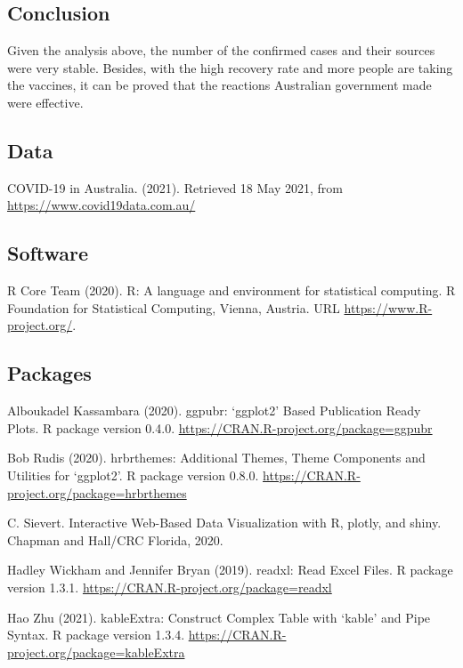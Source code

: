 \documentclass[11pt,a4paper,]{article}
\begin{document}
\hypertarget{conclusion}{%
\subsection{Conclusion}\label{conclusion}}

Given the analysis above, the number of the confirmed cases and their sources were very stable. Besides, with the high recovery rate and more people are taking the vaccines, it can be proved that the reactions Australian government made were effective.

\hypertarget{data}{%
\subsection{Data}\label{data}}

COVID-19 in Australia. (2021). Retrieved 18 May 2021, from \url{https://www.covid19data.com.au/}

\hypertarget{software}{%
\subsection{Software}\label{software}}

R Core Team (2020). R: A language and environment for statistical computing. R Foundation for Statistical Computing, Vienna, Austria. URL \url{https://www.R-project.org/}.

\hypertarget{packages}{%
\subsection{Packages}\label{packages}}

Alboukadel Kassambara (2020). ggpubr: `ggplot2' Based Publication Ready Plots. R package version 0.4.0. \url{https://CRAN.R-project.org/package=ggpubr}

Bob Rudis (2020). hrbrthemes: Additional Themes, Theme Components and Utilities for `ggplot2'. R package version 0.8.0. \url{https://CRAN.R-project.org/package=hrbrthemes}

C. Sievert. Interactive Web-Based Data Visualization with R, plotly, and shiny. Chapman and Hall/CRC Florida, 2020.

Hadley Wickham and Jennifer Bryan (2019). readxl: Read Excel Files. R package version 1.3.1. \url{https://CRAN.R-project.org/package=readxl}

Hao Zhu (2021). kableExtra: Construct Complex Table with `kable' and Pipe Syntax. R package version 1.3.4. \url{https://CRAN.R-project.org/package=kableExtra}
\end{document}
